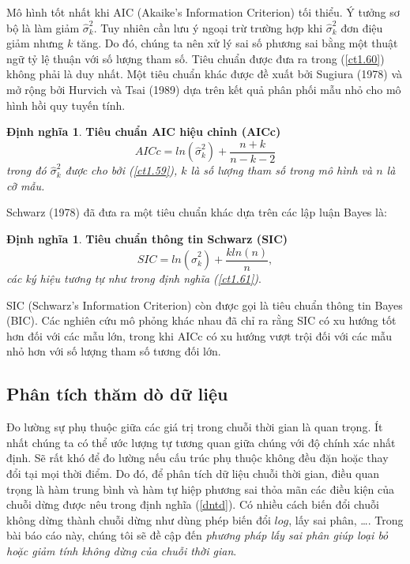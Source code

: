 \documentclass[12pt, a4paper,oneside]{book}
\theoremstyle{definition}
\newtheorem{dn}[theo]{Định nghĩa}
\begin{document}
Mô hình tốt nhất khi AIC (Akaike's Information Criterion) tối thiểu. Ý tưởng sơ bộ là làm giảm $\widehat{\sigma}_{k}^{2}$. Tuy nhiên cần lưu ý ngoại trừ trường hợp khi $ \widehat{\sigma}_{k}^{2} $ đơn điệu giảm nhưng $ k $ tăng. Do đó, chúng ta nên xử lý sai số phương sai  bằng một thuật ngữ tỷ lệ thuận với số lượng tham số. Tiêu chuẩn được đưa ra trong (\ref{ct1.60}) không phải là duy nhất. Một tiêu chuẩn khác được đề xuất bởi Sugiura (1978) và mở rộng bởi Hurvich và Tsai (1989) dựa trên kết quả phân phối mẫu nhỏ cho mô hình hồi quy tuyến tính.
\begin{dn}\cite{8} \textbf{Tiêu chuẩn AIC hiệu chỉnh (AICc)}
	\textit{\begin{equation}
		AICc= ln (\widehat{\sigma}_{k}^{2}) +\dfrac{n+ k}{n-k-2} \label{ct1.61}
		\end{equation} 
		trong đó $ \widehat{\sigma}_{k}^{2} $ được cho bởi (\ref{ct1.59}), $ k $ là số lượng tham số trong mô hình và $ n $ là cỡ mẫu.}	
\end{dn}
Schwarz (1978) đã đưa ra một tiêu chuẩn khác dựa trên các lập luận Bayes là:
\begin{dn}\cite{8} 	
	\textbf{Tiêu chuẩn thông tin Schwarz (SIC)} 
	\textit{\begin{equation}
		SIC= ln (\widehat{\sigma}_{k}^{2}) +\dfrac{kln(n)}{n}, \label{ct1.62}
		\end{equation}
		các ký hiệu tương tự như trong định nghĩa (\ref{ct1.61})}.
\end{dn}
SIC (Schwarz's Information Criterion) còn được gọi là tiêu chuẩn thông tin Bayes (BIC). Các nghiên cứu mô phỏng khác nhau đã chỉ ra rằng SIC có xu hướng tốt hơn đối với các mẫu lớn, trong khi AICc có xu hướng vượt trội đối với các mẫu nhỏ hơn với số lượng tham số tương đối lớn.
\subsection{Phân tích thăm dò dữ liệu}
Đo lường sự phụ thuộc giữa các giá trị trong chuỗi thời gian là quan trọng. Ít nhất chúng ta có thể ước lượng tự tương quan giữa chúng với độ chính xác nhất định. Sẽ rất khó để đo lường nếu cấu trúc phụ thuộc không đều đặn hoặc thay đổi tại mọi thời điểm. Do đó, để phân tích dữ liệu chuỗi thời gian, điều quan trọng là hàm trung bình và hàm tự hiệp phương sai thỏa mãn các điều kiện của chuỗi dừng được nêu trong định nghĩa (\ref{dntd}). Có nhiều cách biến đổi chuỗi không dừng thành chuỗi dừng như dùng phép biến đổi $log$, lấy sai phân, \dots. Trong bài báo cáo này, chúng tôi sẽ đề cập đến \textit{phương pháp lấy sai phân giúp loại bỏ hoặc giảm tính không dừng của chuỗi thời gian}.
\end{document}
